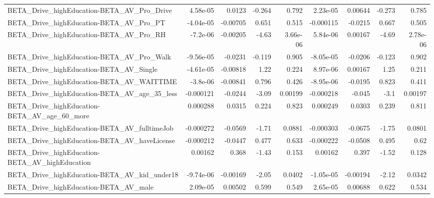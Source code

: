 \begin{tabular}{lrrrrrrrr}
BETA\_Drive\_highEducation-BETA\_AV\_Pro\_Drive         &    4.58e-05 &       0.0123 &    -0.264 &    0.792 &   2.23e-05 &     0.00644 &       -0.273 &         0.785 \\
BETA\_Drive\_highEducation-BETA\_AV\_Pro\_PT            &   -4.04e-05 &     -0.00705 &     0.651 &    0.515 &  -0.000115 &     -0.0215 &        0.667 &         0.505 \\
BETA\_Drive\_highEducation-BETA\_AV\_Pro\_RH            &    -7.2e-06 &     -0.00205 &     -4.63 & 3.66e-06 &   5.84e-06 &     0.00167 &        -4.69 &      2.78e-06 \\
BETA\_Drive\_highEducation-BETA\_AV\_Pro\_Walk          &   -9.56e-05 &      -0.0231 &    -0.119 &    0.905 &  -8.05e-05 &     -0.0206 &       -0.123 &         0.902 \\
BETA\_Drive\_highEducation-BETA\_AV\_Single            &   -4.61e-05 &     -0.00818 &      1.22 &    0.224 &   8.97e-06 &     0.00167 &         1.25 &         0.211 \\
BETA\_Drive\_highEducation-BETA\_AV\_WAITTIME          &    -3.8e-06 &     -0.00841 &     0.796 &    0.426 &  -8.95e-06 &     -0.0195 &        0.823 &         0.411 \\
BETA\_Drive\_highEducation-BETA\_AV\_age\_35\_less       &   -0.000121 &      -0.0244 &     -3.09 &  0.00199 &  -0.000218 &      -0.045 &         -3.1 &       0.00197 \\
BETA\_Drive\_highEducation-BETA\_AV\_age\_60\_more       &    0.000288 &       0.0315 &     0.224 &    0.823 &   0.000249 &      0.0303 &        0.239 &         0.811 \\
BETA\_Drive\_highEducation-BETA\_AV\_fulltimeJob       &   -0.000272 &      -0.0569 &     -1.71 &   0.0881 &  -0.000303 &     -0.0675 &        -1.75 &        0.0801 \\
BETA\_Drive\_highEducation-BETA\_AV\_haveLicense       &   -0.000212 &      -0.0447 &     0.477 &    0.633 &  -0.000222 &     -0.0508 &        0.495 &          0.62 \\
BETA\_Drive\_highEducation-BETA\_AV\_highEducation     &     0.00162 &        0.368 &     -1.43 &    0.153 &    0.00162 &       0.397 &        -1.52 &         0.128 \\
BETA\_Drive\_highEducation-BETA\_AV\_kid\_under18       &   -9.74e-06 &     -0.00169 &     -2.05 &   0.0402 &  -1.05e-05 &    -0.00194 &        -2.12 &        0.0342 \\
BETA\_Drive\_highEducation-BETA\_AV\_male              &    2.09e-05 &      0.00502 &     0.599 &    0.549 &   2.65e-05 &     0.00688 &        0.622 &         0.534 \\

\end{tabular}
